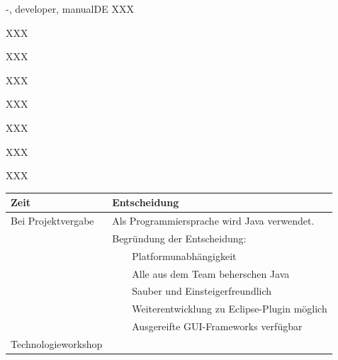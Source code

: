 \documentclass[twoside]{report}
\newcommand{\tabitem}{~~\llap{\textbullet}~~}
\begin{document}
\begin{shownto}{-, developer, manualDE}
XXX

\nsecend

%
%
% 

XXX
\nsecend

XXX
\nsecend

XXX
\nsecend

XXX
\nsecend


\nsecend

\nsecend %




\nsecend

XXX
\nsecend

XXX
\nsecend

XXX
\nsecend


\begin{table}[h]
\centering
\begin{tabular}{|l|l|}
\toprule
Zeit & Entscheidung \\
\midrule
Bei Projektvergabe & Als Programmiersprache wird Java verwendet.\\
& Begründung der Entscheidung:\\
&      \tabitem Platformunabhängigkeit\\
&      \tabitem Alle aus dem Team beherschen Java\\
&      \tabitem Sauber und Einsteigerfreundlich\\
&      \tabitem Weiterentwicklung zu Eclipse-Plugin möglich\\
&      \tabitem Ausgereifte GUI-Frameworks verfügbar\\
\midrule
Technologieworkshop & \\
\bottomrule
\end{tabular}
\end{table}
\nsecend


\nsecend %

\end{shownto} %
\end{document}
